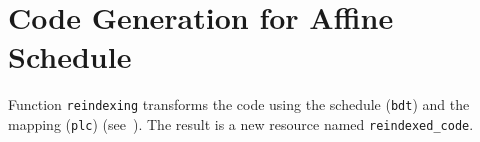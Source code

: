 \documentclass[a4paper]{report}
\newenvironment{PipsMake}{\begin{alltt}}{\end{alltt}}
\newcommand{\PipsPassRef}[1]{\texttt{\detokenize{#1}}~\ref{pass:#1}}
\begin{document}
%
%
%
%





\section{Code Generation for Affine Schedule}

Function \texttt{reindexing} transforms the code using the schedule
(\texttt{bdt}) and the mapping (\texttt{plc}) (see~\cite{Col93,Pla95a}). The
result is a new resource named \verb/reindexed_code/.

\end{document}
